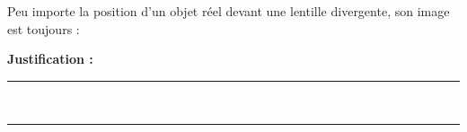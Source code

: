 Peu importe la position d'un objet réel devant une lentille divergente, son image est toujours :

\choices

\noindent\textbf{Justification :} \hrulefill \\[2.5ex]
\rule{\linewidth}{0.4pt} \\[2.5ex]
\rule{\linewidth}{0.4pt}
\vfill
